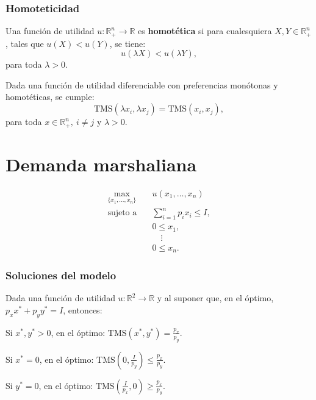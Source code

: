 \documentclass[8pt,a4paper]{extarticle}
\begin{document}
\begin{multicols}{3}
\subsubsection*{Homoteticidad}

\begin{boxdef}[Homoteticidad]
	Una función de utilidad $u : \mathbb{R}^n_+ \to \mathbb{R}$ es \textbf{homotética} si para cualesquiera $X, Y \in \mathbb{R}^n_+$, tales que $u(X) < u(Y)$, se tiene:
	\[
		u(\lambda X ) < u(\lambda Y)
	,\] 
	para toda $\lambda > 0$.
\end{boxdef}

\begin{boxtheo}
	Dada una función de utilidad diferenciable con preferencias monótonas y homotéticas, se cumple:
	\[
		\text{TMS} (\lambda x_i, \lambda x_j) = \text{TMS} (x_i, x_j)
	,\] para toda $x \in \mathbb{R}^n_+,\ i \neq j$ y $\lambda > 0$.
\end{boxtheo}

\newpage

\section{Demanda marshaliana}

\begin{equation*}
\begin{aligned}
	\max_{\{x_1, \ldots, x_n\}}\	  & u(x_1, \ldots, x_n) \\
	\text{sujeto a} \quad & \sum_{i=1}^{n} p_i x_i \le I, \\
						  & 0 \le x_1, \\
						  & \quad \vdots \\
						  & 0 \le x_n.
\end{aligned}
\end{equation*}

\subsubsection*{Soluciones del modelo}

Dada una función de utilidad $u : \mathbb{R}^2 \to \mathbb{R}$ y al suponer que, en el óptimo, $p_x x^* + p_y y^* = I$, entonces:

\begin{bulletlist}
\item Si $x^*, y^* > 0$, en el óptimo: $\displaystyle \text{TMS} (x^*, y^*) = \frac{p_x}{p_y}$.
\item Si $x^* = 0$, en el óptimo: $\displaystyle \text{TMS} \left(0, \frac{I}{p_y}\right) \le \frac{p_x}{p_y}$.
\item Si $y^* = 0$, en el óptimo: $\displaystyle \text{TMS} \left(\frac{I}{p_x}, 0\right) \ge \frac{p_x}{p_y}$.
\end{bulletlist}


\end{multicols}
\end{document}

